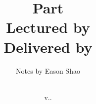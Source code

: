 \title{Part \Part\space\Course \\ \vspace{0.5em}
\Large{Lectured by \Lecturer} \\ \vspace{0.5em}
\Large{Delivered by \Department}}
\author{Notes by Eason Shao}
\date{\Term\space\Year \\ \vspace{0.5em} \normalsize v.\DATE.\COMMITSHA}